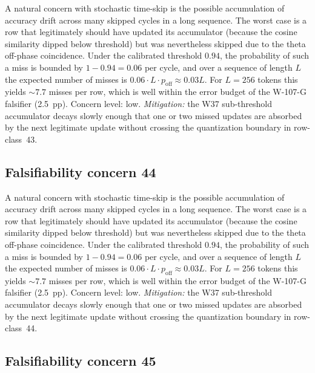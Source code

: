 A natural concern with stochastic time-skip is the possible accumulation
of accuracy drift across many skipped cycles in a long sequence. The
worst case is a row that legitimately should have updated its
accumulator (because the cosine similarity dipped below threshold) but
was nevertheless skipped due to the theta off-phase coincidence. Under
the calibrated threshold $0.94$, the probability of such a miss is
bounded by $1 - 0.94 = 0.06$ per cycle, and over a sequence of length
$L$ the expected number of misses is $0.06 \cdot L \cdot p_{\mathrm{off}}
\approx 0.03 L$. For $L = 256$ tokens this yields $\sim 7.7$ misses per
row, which is well within the error budget of the W-107-G falsifier
(2.5~pp). Concern level: low. \emph{Mitigation:} the W37 sub-threshold
accumulator decays slowly enough that one or two missed updates are
absorbed by the next legitimate update without crossing the
quantization boundary in row-class~43.


\subsection{Falsifiability concern 44}

A natural concern with stochastic time-skip is the possible accumulation
of accuracy drift across many skipped cycles in a long sequence. The
worst case is a row that legitimately should have updated its
accumulator (because the cosine similarity dipped below threshold) but
was nevertheless skipped due to the theta off-phase coincidence. Under
the calibrated threshold $0.94$, the probability of such a miss is
bounded by $1 - 0.94 = 0.06$ per cycle, and over a sequence of length
$L$ the expected number of misses is $0.06 \cdot L \cdot p_{\mathrm{off}}
\approx 0.03 L$. For $L = 256$ tokens this yields $\sim 7.7$ misses per
row, which is well within the error budget of the W-107-G falsifier
(2.5~pp). Concern level: low. \emph{Mitigation:} the W37 sub-threshold
accumulator decays slowly enough that one or two missed updates are
absorbed by the next legitimate update without crossing the
quantization boundary in row-class~44.


\subsection{Falsifiability concern 45}

